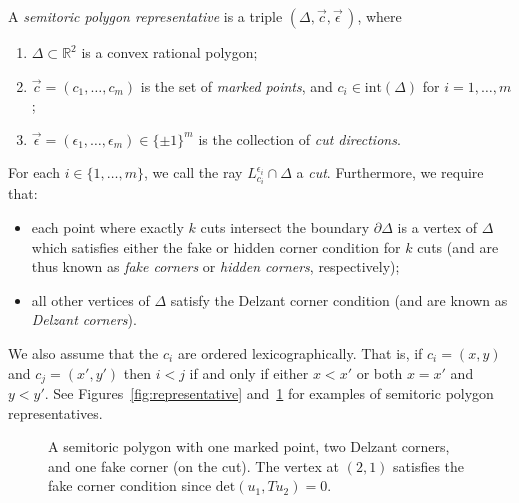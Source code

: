 \documentclass[pdftex]{sigma}
\numberwithin{equation}{section}
\newcommand{\De}{\Delta}
\newcommand{\strep}{(\De,\vec{c},\vec{\epsilon}\,)}
\begin{document}
\begin{Definition}\label{def:stpoly-representative} A \emph{semitoric polygon representative} is a triple $\strep$, where
\begin{enumerate}\itemsep=0pt
 \item[(1)] $\Delta \subset \mathbb{R}^{2}$ is a convex rational polygon;
 \item[(2)] $\vec c = (c_1,\dots,c_m)$ is the set of \emph{marked points}, and $c_i \in \textrm{int}(\Delta)$ for $i = 1,\dots,m$;
 \item[(3)] $\vec{\epsilon} = (\epsilon_1,\dots,\epsilon_m) \in \{ \pm1 \}^m$ is the collection of \emph{cut directions}.
\end{enumerate}
For each $i\in\{1,\ldots,m\}$, we call the ray $L_{c_i}^{\epsilon_i}\cap\Delta$ a \emph{cut}.
Furthermore, we require that:
 \begin{itemize}\itemsep=0pt
 \item each point where exactly $k$ cuts intersect the boundary $\partial \Delta$ is a vertex of $\Delta$ which satisfies either the fake or hidden corner condition for $k$ cuts (and are thus known as \emph{fake corners} or \emph{hidden corners}, respectively);
 \item all other vertices of $\Delta$ satisfy the Delzant corner condition (and are known as \emph{Delzant corners}).
 \end{itemize}
\end{Definition}





We also assume that the $c_i$ are ordered lexicographically. That is, if $c_i = (x,y)$ and $c_j = (x',y')$ then $i<j$ if and only if either $x<x'$ or both $x=x'$ and $y < y'$.
See Figures~\ref{fig:representative} and~\ref{fig:sem1} for examples of semitoric polygon representatives.

 \begin{figure}
 \begin{center}
 \caption{A semitoric polygon with one marked point, two Delzant corners, and one fake corner (on the cut). The vertex at $(2,1)$ satisfies the fake corner condition since $\mathrm{det}(u_1,Tu_2) = 0$.}
 \label{fig:sem1}
 \end{center}
 \end{figure}
\end{document}
